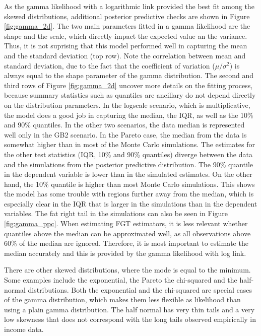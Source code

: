 As the gamma likelihood with a logarithmic link provided the best fit among the skewed distributions, additional posterior predictive checks are shown in Figure \ref{fig:gamma_2d}.
The two main parameters fitted in a gamma likelihood are the shape and the scale, which directly impact the expected value an the variance.
Thus, it is not suprising that this model performed well in capturing the mean and the standard deviation (top row).
Note the correlation between mean and standard deviation, due to the fact that the coefficient of variation ($\mu / \sigma^2$) is always equal to the shape parameter of the gamma distribution.
The second and third rows of Figure \ref{fig:gamma_2d} uncover more details on the fitting process, because summary statistics such as quantiles are ancillary do not depend directly on the distribution parameters.
In the logscale scenario, which is multiplicative, the model does a good job in capturing the median, the IQR, as well as the 10\% and 90\% quantiles.
In the other two scenarios, the data median is represented well only in the GB2 scenario.
In the Pareto case, the median from the data is somewhat higher than in most of the Monte Carlo simulations.
The estimates for the other test statistics (IQR, 10\% and 90\% quantiles) diverge between the data and the simulations from the posterior predictive distribution.
The 90\% quantile in the dependent variable is lower than in the simulated estimates.
On the other hand, the 10\% quantile is higher than most Monte Carlo simulations.
This shows the model has some trouble with regions further away from the median, which is especially clear in the IQR that is larger in the simulations than in the dependent variables.
The fat right tail in the simulations can also be seen in Figure \ref{fig:gamma_ppc}.
When estimating FGT estimators, it is less relevant whether quantiles above the median can be approximated well, as all observations above 60\% of the median are ignored.
Therefore, it is most important to estimate the median accurately and this is provided by the gamma likelihood with log link.

There are other skewed distributions, where the mode is equal to the minimum.
Some examples include the exponential, the Pareto the chi-squared and the half-normal distributions.
Both the exponential and the chi-squared are special cases of the gamma distribution, which makes them less flexible as likelihood than using a plain gamma distribution.
The half normal has very thin tails and a very low skewness that does not correspond with the long tails observed empirically in income data.

